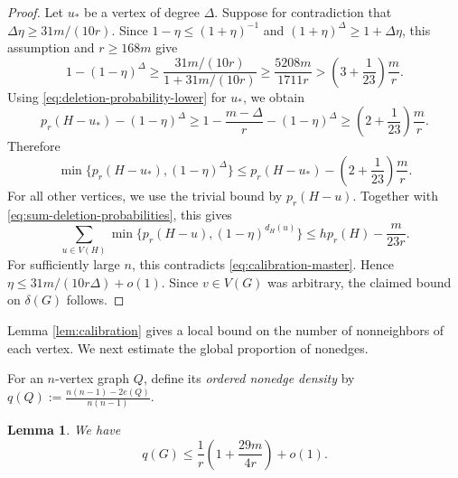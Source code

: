 \documentclass[11pt]{article}
\numberwithin{equation}{section}
\newtheorem{lemma}[theorem]{Lemma}
\theoremstyle{definition}
\theoremstyle{remark}
\begin{document}
\begin{proof}
Let $u_*$ be a vertex of degree $\Delta$. Suppose for contradiction that $\Delta\eta\ge 31m/(10r)$. Since $1-\eta\le (1+\eta)^{-1}$ and $(1+\eta)^\Delta\ge 1+\Delta\eta$, this assumption and $r\ge 168m$ give
\begin{equation}
\label{eq:degree-loss-calibrated}
1-(1-\eta)^\Delta
\ge \frac{31m/(10r)}{1+31m/(10r)}
\ge \frac{5208m}{1711r}
>\left(3+\frac1{23}\right)\frac mr.
\end{equation}
Using \eqref{eq:deletion-probability-lower} for $u_*$, we obtain
\[
p_r(H-u_*)-(1-\eta)^\Delta\ge 1-\frac{m-\Delta}{r}-(1-\eta)^\Delta\ge \left(2+\frac1{23}\right)\frac mr.
\]
Therefore
\[
\min\{p_r(H-u_*),(1-\eta)^\Delta\}
\le p_r(H-u_*)-\left(2+\frac1{23}\right)\frac mr.
\]
For all other vertices, we use the trivial bound by $p_r(H-u)$. Together with \eqref{eq:sum-deletion-probabilities}, this gives
\[
\sum_{u\in V(H)}\min\{p_r(H-u),(1-\eta)^{d_H(u)}\}
\le hp_r(H)-\frac{m}{23r}.
\]
For sufficiently large $n$, this contradicts \eqref{eq:calibration-master}. Hence $\eta\le 31m/(10r\Delta)+o(1)$. Since $v\in V(G)$ was arbitrary, the claimed bound on $\delta(G)$ follows.
\end{proof}

Lemma \ref{lem:calibration} gives a local bound on the number of nonneighbors of each vertex. We next estimate the global proportion of nonedges.

For an $n$-vertex graph $Q$, define its \emph{ordered nonedge density} by $q(Q):=\tfrac{n(n-1)-2e(Q)}{n(n-1)}$.

\begin{lemma}
\label{lem:nonedge-density}
We have
\[
q(G)\le \frac1r\left(1+\frac{29m}{4r}\right)+o(1).
\]
\end{lemma}
\end{document}
